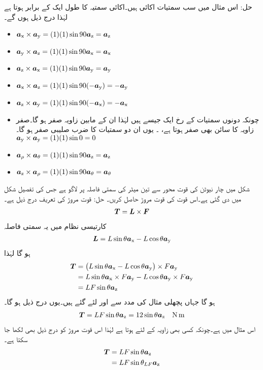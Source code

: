 حل: اس مثال میں سب سمتیات اکائی ہیں۔اکائی سمتیہ کا طول ایک کے برابر ہوتا ہے لہٰذا درج ذیل ہوں گے۔
\begin{itemize}
\item
$\ax \times \ay=(1)(1) \sin 90 \az =\az$
\item
$\ay \times \az=(1)(1) \sin 90 \ax =\ax$
\item
$\az \times \ax=(1)(1) \sin 90 \ay =\ay$
\item
$\ax \times \az=(1)(1) \sin 90 (-\ay) =-\ay$
\item
$\az \times \ay=(1)(1) \sin 90 (-\ax) =-\ax$
\item
چونکہ دونوں سمتیات کے رخ ایک جیسے ہیں لہٰذا ان کے مابین زاویہ صفر ہو گا۔صفر زاویہ کا سائن بھی صفر ہوتا ہے، ۔ یوں ان دو سمتیات  کا ضرب صلیبی صفر ہو گا۔\\
$\ay \times \ay=(1)(1) \sin 0  =0$
\item
$\arho \times \atheta=(1)(1) \sin 90  \az =\az$
\item
$\az \times \arho=(1)(1) \sin 90 \atheta =\atheta $
\end{itemize}
%
شکل  میں  چار نیوٹن کی قوت  محور سے تین میٹر کی سمتی فاصلہ   پر لاگو ہے جس  کی تفصیل شکل میں دی گئی ہے۔اس قوت کی قوت مروڑ  حاصل کریں۔
حل:	قوت مروڑ  کی تعریف درج ذیل  ہے۔
\begin{align}
\kvec{T}=\kvec{L} \times \kvec{F}
\end{align}
کارتیسی نظام میں یہ سمتی فاصلہ
\begin{align}
\kvec{L}=L \sin \theta \ax-L \cos \theta \ay
\end{align}
ہو گا لہٰذا
\begin{align*}
\kvec{T}&=\left(L \sin \theta \ax-L \cos \theta \ay \right) \times F \ay\\
&=L \sin \theta \ax \times F \ay-L \cos \theta \ay \times F \ay\\
&= L F \sin \theta \az
\end{align*} 
ہو گا جہاں پچھلی مثال کی مدد سے  اور  لئے گئے ہیں۔یوں درج ذیل ہو گا۔
\begin{align*}
\kvec{T}= L F \sin \theta \az=12 \sin \theta \az \quad \si{\newton \meter}
\end{align*}
اس مثال میں  ہے۔چونکہ کسی بھی زاویہ    کے لئے  ہوتا ہے لہٰذا اس قوت مروڑ کو درج ذیل بھی لکھا جا سکتا ہے۔
\begin{align*}
\kvec{T}&=LF\sin \theta \az\\
&=L F \sin \theta_{LF}\az
\end{align*}
